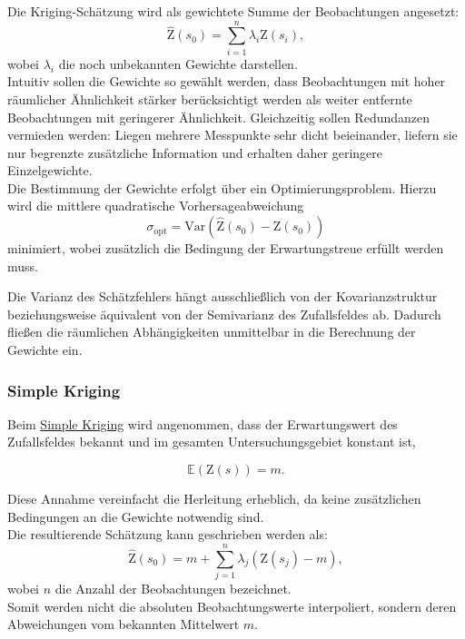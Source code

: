 Die Kriging-Schätzung wird als gewichtete Summe der Beobachtungen angesetzt:
\begin{equation}
\hat{\mathrm{Z}}(s_0) =
\sum_{i=1}^{n}\lambda_i \mathrm{Z}(s_i),
\end{equation}
wobei $\lambda_i$ die noch unbekannten Gewichte darstellen.\\
Intuitiv sollen die Gewichte so gewählt werden, 
dass Beobachtungen mit hoher räumlicher Ähnlichkeit stärker berücksichtigt werden 
als weiter entfernte Beobachtungen mit geringerer Ähnlichkeit.
Gleichzeitig sollen Redundanzen vermieden werden: 
Liegen mehrere Messpunkte sehr dicht beieinander, liefern sie nur
begrenzte zusätzliche Information und erhalten daher geringere
 Einzelgewichte.\\
Die Bestimmung der Gewichte erfolgt über ein Optimierungsproblem. 
Hierzu wird die mittlere quadratische Vorhersageabweichung
\begin{equation}
\sigma_{\mathrm{opt}} =
\mathrm{Var}
\left(
\hat{\mathrm{Z}}(s_0)- \mathrm{Z}(s_0)\right)
\end{equation}
minimiert, wobei zusätzlich die Bedingung der Erwartungstreue 
erfüllt werden muss.

Die Varianz des Schätzfehlers hängt ausschließlich von der
Kovarianzstruktur beziehungsweise äquivalent von der Semivarianz 
des Zufallsfeldes ab. Dadurch fließen die räumlichen 
Abhängigkeiten unmittelbar in die Berechnung der Gewichte ein.

\subsubsection{Simple Kriging}
Beim \underline{Simple Kriging} wird angenommen, dass der Erwartungswert des Zufallsfeldes 
bekannt und im gesamten Untersuchungsgebiet konstant ist,

\begin{equation}
\mathbb{E}\left( \mathrm{Z}(s) \right)=m.
\end{equation}

Diese Annahme vereinfacht die Herleitung erheblich, da keine zusätzlichen Bedingungen 
an die Gewichte notwendig sind.\\
Die resultierende Schätzung kann geschrieben werden als:
\begin{equation}
\hat{\mathrm{Z}}(s_0) = m + \sum_{j=1}^{n} \lambda_j
\left( \mathrm{Z}(s_j)- m \right),
\end{equation}
wobei $n$ die Anzahl der Beobachtungen bezeichnet.\\ 
Somit werden nicht die absoluten Beobachtungswerte interpoliert, sondern deren 
Abweichungen vom bekannten Mittelwert $m$.


